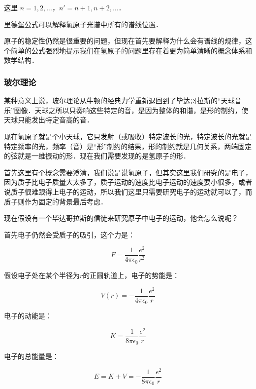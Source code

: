 这里 $n = 1,  2, ...$，$n' = n+1, n+2, ...$．

里德堡公式可以解释氢原子光谱中所有的谱线位置．

原子的稳定性仍然是很重要的问题，但现在首先要解释为什么会有谱线的规律，这个简单的公式强烈地提示我们在氢原子的问题里存在着更为简单清晰的概念体系和数学结构．

\subsubsection{玻尔理论}


某种意义上说，玻尔理论从牛顿的经典力学重新退回到了毕达哥拉斯的“天球音乐”图像．天球之所以只奏响这些特定的音，是因为整体的和谐，是形的制约，使天球只能发出特定音高的音．

现在氢原子就是个小天球，它只发射（或吸收）特定波长的光，特定波长的光就是特定频率的光，频率（音）是“形”制约的结果，形的制约就是几何关系，两端固定的弦就是一维振动的形．现在我们需要发现的是氢原子的形．

首先这里有个概念需要澄清，我们说是说氢原子，但其实这里我们研究的是电子，因为质子比电子质量大太多了，质子运动的速度比电子运动的速度要小很多，或者说质子很难跟得上电子的运动，所以我们这里只需要研究电子的运动就可以了，而质子则作为固定的背景最后考虑．

现在假设有一个毕达哥拉斯的信徒来研究原子中电子的运动，他会怎么说呢？

首先电子仍然会受质子的吸引，这个力是：

\begin{equation}
F = \frac{1}{4 \pi \epsilon_0} \frac{e^2}{ r^2 }
\end{equation}

假设电子处在某个半径为$r$的正圆轨道上，电子的势能是：

\begin{equation}
V(r) = - \frac{1}{4 \pi \epsilon_0} \frac{e^2}{ r }
\end{equation}

电子的动能是：

\begin{equation}
K = \frac{1}{8 \pi \epsilon_0} \frac{e^2}{ r }
\end{equation}

电子的总能量是：

\begin{equation}
E = K + V = - \frac{1}{8 \pi \epsilon_0} \frac{e^2}{ r }
\end{equation}

